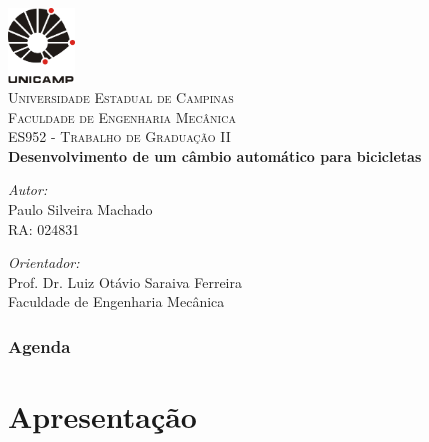 \documentclass{beamer}
\begin{document}
\begin{frame}[plain]
  \begin{center}
    \includegraphics[width=0.7in]{unicamp128}\\[0.5cm]
    \textsc{\large Universidade Estadual de Campinas}\\%
    \textsc{\large Faculdade de Engenharia Mecânica}\\%
    \textsc{\large ES952 - Trabalho de Graduação II}\\[1.0cm]


    \textsf{  \bfseries Desenvolvimento de um câmbio automático
  para bicicletas}

    \vfill
    \begin{minipage}{0.4\textwidth}
    \begin{flushleft} \tiny
    \emph{Autor:}\\
    Paulo Silveira Machado \\
    RA: 024831
    \end{flushleft}
    \end{minipage}
    \begin{minipage}{0.4\textwidth}
    \begin{flushright} \tiny
    \emph{Orientador:} \\
    Prof. Dr. Luiz Otávio Saraiva Ferreira\\
    Faculdade de Engenharia Mecânica
    \end{flushright}
    \end{minipage}

  \end{center}

\end{frame}

\begin{frame}[plain]
  \frametitle{Agenda}
  \tableofcontents
\end{frame}


\section{Apresentação}
\end{document}
